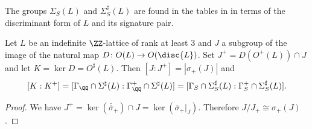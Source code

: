 The groups $\Sigma_S(L)$ and $\Sigma_S^\sharp(L)$ are found in the tables in \cite[VII]{miranda-morrison} in terms of the discriminant form of $L$ and its signature pair.

\begin{proposition}\label{plusindexcompute}
 Let $L$ be an indefinite $\ZZ$-lattice of rank at least $3$ and $J$ a subgroup of the image of the natural map $D \colon O(L) \to O(\disc{L})$. Set $J^+ = D(O^+(L)) \cap J$ and let $K = \ker D=O^\sharp(L)$.
 Then $[J:J^+]=| \sigma_+(J)|$ and \[[K:K^+]= [\Gamma_\QQ \cap \Sigma^\sharp(L): \Gamma_\QQ^+ \cap \Sigma^\sharp(L)] =
 [\Gamma_S \cap \Sigma^\sharp_S(L): \Gamma_S^+ \cap \Sigma^\sharp_S(L)].\]
\end{proposition}
\begin{proof}
We have $J^+ = \ker (\bar \bar \sigma_+) \cap J = \ker (\bar \sigma_+|_J)$.
Therefore $J/J_+ \cong \sigma_+(J)$.


\end{proof}
